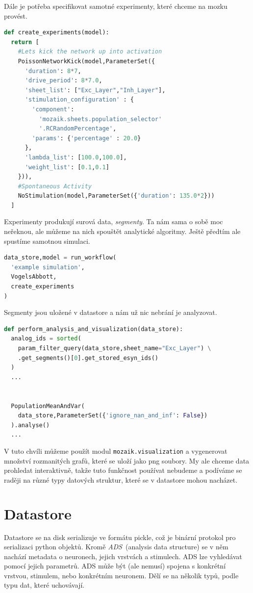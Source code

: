 Dále je potřeba specifikovat samotné experimenty, které chceme na mozku provést.

\begin{lstlisting}[language=Python]
def create_experiments(model):
  return [
    #Lets kick the network up into activation
    PoissonNetworkKick(model,ParameterSet({
      'duration': 8*7,
      'drive_period': 8*7.0,
      'sheet_list': ["Exc_Layer","Inh_Layer"],
      'stimulation_configuration' : {
        'component':
          'mozaik.sheets.population_selector'
          '.RCRandomPercentage',
        'params': {'percentage' : 20.0}
      },
      'lambda_list': [100.0,100.0],
      'weight_list': [0.1,0.1]
    })),
    #Spontaneous Activity 
    NoStimulation(model,ParameterSet({'duration': 135.0*2}))
  ]
\end{lstlisting}

Experimenty produkují surová data, \emph{segmenty}. Ta nám sama o sobě moc neřeknou, ale můžeme na nich spouštět analytické algoritmy. Ještě předtím ale spustíme samotnou simulaci.

\begin{lstlisting}[language=Python]
data_store,model = run_workflow(
  'example simulation',
  VogelsAbbott,
  create_experiments
)
\end{lstlisting}

Segmenty jsou uložené v datastore a nám už nic nebrání je analyzovat.

\begin{lstlisting}[language=Python]
def perform_analysis_and_visualization(data_store):
  analog_ids = sorted(
    param_filter_query(data_store,sheet_name="Exc_Layer") \
    .get_segments()[0].get_stored_esyn_ids()
  )
  ...

  
  PopulationMeanAndVar(
    data_store,ParameterSet({'ignore_nan_and_inf': False})
  ).analyse()
  ...
\end{lstlisting}

V tuto chvíli můžeme použít modul \lstinline|mozaik.visualization| a vygenerovat množství rozmanitých grafů, které se uloží jako png soubory. My ale chceme data prohledat interaktivně, takže tuto funkčnost používat nebudeme a podíváme se raději na různé typy datových struktur, které se v datastore mohou nacházet.

\section{Datastore}

Datastore se na disk serializuje ve formátu pickle, což je binární protokol pro serializaci python objektů. Kromě \emph{ADS}~(analysis data structure) se v něm nachází metadata o neuronech, jejich vrstvách a stimulech. ADS lze vyhledávat pomocí jejich parametrů. ADS může být (ale nemusí) spojena s konkrétní vrstvou, stimulem, nebo konkrétním neuronem. Dělí se na několik typů, podle typu dat, které uchovávají.

